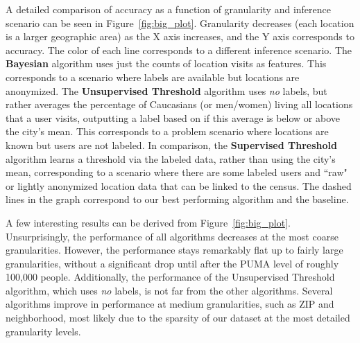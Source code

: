 A detailed comparison of accuracy as a function of granularity and inference scenario can be seen in Figure~\ref{fig:big_plot}.
Granularity decreases (each location is a larger geographic area) as the X axis increases, and the Y axis corresponds to accuracy.
The color of each line corresponds to a different inference scenario.
The \textbf{Bayesian} algorithm uses just the counts of location visits as features.
This corresponds to a scenario where labels are available but locations are anonymized.
The \textbf{Unsupervised Threshold} algorithm uses \emph{no} labels, but rather averages the percentage of Caucasians (or men/women) living all locations that a user visits, outputting a label based on if this average is below or above the city's mean.
This corresponds to a problem scenario where locations are known but users are not labeled.
In comparison, the \textbf{Supervised Threshold} algorithm learns a threshold via the labeled data, rather than using the city's mean, corresponding to a scenario where there are some labeled users and ``raw" or lightly anonymized location data that can be linked to the census.
The dashed lines in the graph correspond to our best performing algorithm and the baseline.

A few interesting results can be derived from Figure~\ref{fig:big_plot}.
Unsurprisingly, the performance of all algorithms decreases at the most coarse granularities. 
However, the performance stays remarkably flat up to fairly large granularities, without a significant drop until after the PUMA level of roughly 100,000 people.
Additionally, the performance of the Unsupervised Threshold algorithm, which uses \emph{no} labels, is not far from the other algorithms.
Several algorithms improve in performance at medium granularities, such as ZIP and neighborhood, most likely due to the sparsity of our dataset at the most detailed granularity levels.

